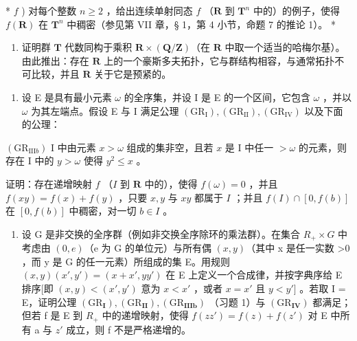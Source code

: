 * \(f\) ) 对每个整数 \(n \geqslant 2\) ，给出连续单射同态 \(f\) （\(\mathbf{R}\) 到 \(\mathbf{T}^n\) 中的）的例子，使得 \(f(\mathbf{R})\) 在 \(\mathbf{T}^n\) 中稠密（参见第 VII 章，§ 1，第 4 小节，命题 7 的推论 1）。 *

\begin{enumerate}
\def\labelenumi{\arabic{enumi})}
\setcounter{enumi}{2}
\tightlist
\item
  证明群 \(\mathbf{T}\) 代数同构于乘积 \(\mathbf{R} \times (\mathbf{Q}/\mathbf{Z})\)（在 \(\mathbf{R}\) 中取一个适当的哈梅尔基）。由此推出：存在 \(\mathbf{R}\) 上的一个豪斯多夫拓扑，它与群结构相容，与通常拓扑不可比较，并且 \(\mathbf{R}\) 关于它是预紧的。
\end{enumerate}

\ExerciseSection

\begin{enumerate}
\def\labelenumi{\arabic{enumi})}
\tightlist
\item
  设 E 是具有最小元素 \(\omega\) 的全序集，并设 I 是 E 的一个区间，它包含 \(\omega\) ，并以 \(\omega\) 为其左端点。假设 E 与 I 满足公理 \((\mathrm{GR}_{\mathrm{I}}), (\mathrm{GR}_{\mathrm{II}}), (\mathrm{GR}_{\mathrm{IV}})\) 以及下面的公理：
\end{enumerate}

\((\mathrm{GR}_{\mathrm{III}b})\) I 中由元素 \(x > \omega\) 组成的集非空，且若 \(x\) 是 I 中任一 \(> \omega\) 的元素，则存在 I 中的 \(y > \omega\) 使得 \(y^2 \leqslant x\) 。

证明：存在递增映射 \(f\) （\(I\) 到 \(\mathbf{R}\) 中的），使得 \(f(\omega) = 0\) ，并且 \(f(xy) = f(x) + f(y)\) ，只要 \(x, y\) 与 \(xy\) 都属于 \(I\) ；并且 \(f(I) \cap [0, f(b)]\) 在 \([0, f(b)]\) 中稠密，对一切 \(b \in I\) 。

\begin{enumerate}
\def\labelenumi{\arabic{enumi})}
\setcounter{enumi}{1}
\tightlist
\item
  设 G 是非交换的全序群（例如非交换全序除环的乘法群）。在集合 \(R_{+} \times G\) 中考虑由 \((0, e)\)（e 为 G 的单位元）与所有偶 \((x, y)\)（其中 x 是任一实数 \textgreater0 ，而 y 是 G 的任一元素）所组成的集 E。用规则 \((x, y)(x', y') = (x + x', yy')\) 在 E 上定义一个合成律，并按字典序给 E 排序{[}即 \((x, y) < (x', y')\) 意为 \(x < x'\) ，或者 \(x = x'\) 且 \(y < y']\) 。若取 I = E，证明公理 \((\mathrm{GR}_{\mathbf{I}}), (\mathrm{GR}_{\mathbf{II}}), (\mathrm{GR}_{\mathbf{IIIb}})\) （习题 1）与 \((\mathrm{GR}_{\mathbf{IV}})\) 都满足；但若 f 是 E 到 \(R_{+}\) 中的递增映射，使得 \(f(zz') = f(z) + f(z')\) 对 E 中所有 a 与 \(z'\) 成立，则 f 不是严格递增的。
\end{enumerate}

